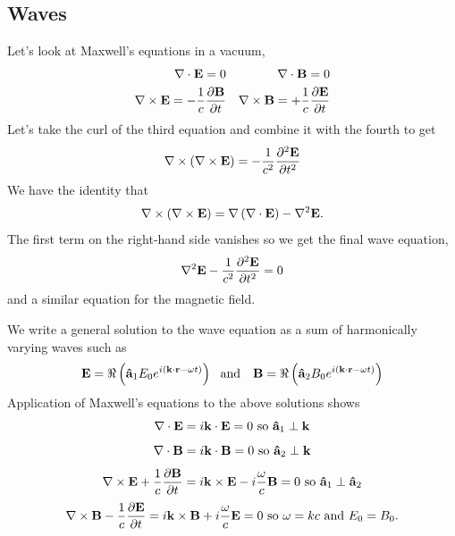 \subsection{Waves}
\label{sec:waves}
Let's look at Maxwell's equations in a vacuum,
\begin{eqnarray}
{\bf \nabla} \cdot {\bf E} = 0 & & {\bf \nabla} \cdot {\bf B} =
0 \nonumber \\
{\bf \nabla} \times {\bf E} = -\frac{1}{c} \frac{\partial {\bf B}}{\partial {t}} & &
{\bf \nabla} \times {\bf B} = +\frac{1}{c} 
\frac{\partial {\bf E}}{\partial {t}} 
\label{eq:137}
\end{eqnarray}
Let's take the curl of the third equation and combine it with the
fourth to get
\begin{equation}
{\bf \nabla} \times \left ({\bf \nabla} \times {\bf E} \right ) =
-\frac{1}{c^2} \frac{\partial {^2 {\bf E}}}{\partial {t^2}}
\label{eq:138}
\end{equation}
We have the identity that
\begin{equation}
{\bf \nabla} \times \left ({\bf \nabla} \times {\bf E} \right ) =
{\bf \nabla} \left ( {\bf \nabla} \cdot {\bf E} \right ) - {\bf
  \nabla}^2 {\bf E}.
\label{eq:139}
\end{equation}
The first term on the right-hand side vanishes so we get the final
wave equation,
\begin{equation}
 {\bf   \nabla}^2 {\bf E}
-\frac{1}{c^2} \frac{\partial {^2 {\bf E}}}{\partial {t^2}} = 0
\label{eq:140}
\end{equation}
and a similar equation for the magnetic field.

We write a general solution to the wave equation as a sum of
harmonically varying waves such as 
\begin{equation}
{\bf E}= \Re \left ({\bf \hat a}_1 E_0 e^{i({\bf k \cdot r}-\omega t)}
\right )
~~\hbox{\rm and}~~~
{\bf B}= \Re \left ( {\bf \hat a}_2 B_0 e^{i({\bf k \cdot r}-\omega
  t)} \right )
\label{eq:141}
\end{equation}
Application of Maxwell's equations to the above solutions shows 
\begin{equation}
\nabla \cdot {\bf E} = i {\bf k} \cdot {\bf E} =0 ~\hbox{\rm so}~
{\bf \hat a}_{1} \perp {\bf k}
\label{eq:142}
\end{equation}
\begin{equation}
\nabla \cdot {\bf B} = i {\bf k} \cdot {\bf B} = 0~\hbox{\rm so}~
{\bf \hat a}_{2} \perp {\bf k}
\label{eq:143}
\end{equation}
\begin{equation}
\nabla \times {\bf E} + \frac{1}{c} \frac{\partial {\bf B}}{\partial {t}} = 
i {\bf k} \times {\bf E} - i \frac{\omega}{c} {\bf B} = 0
~\hbox{\rm so}~{\bf \hat a}_{1} \perp {\bf \hat a}_{2}
\label{eq:144}
\end{equation}
\begin{equation}
\nabla \times {\bf B} - \frac{1}{c} \frac{\partial {\bf E}}{\partial {t}} = 
i {\bf k} \times {\bf B} + i \frac{\omega}{c} {\bf E} = 0
~\hbox{\rm so}~\omega=kc~\hbox{\rm and}~E_0=B_0.
\label{eq:145}
\end{equation}

